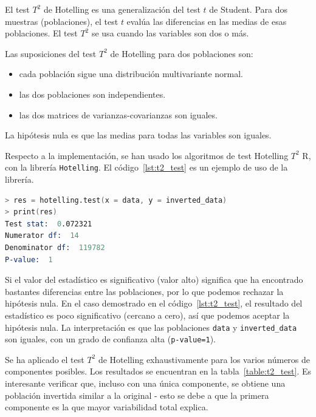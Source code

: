 \documentclass[11pt,spanish,listoffigures,listoftables]{tfgetsinf}
\begin{document}
    El test \(T^2\) de Hotelling es una generalización del test \(t\) de Student. Para dos muestras (poblaciones), el test \(t\) evalúa las diferencias en las medias de esas poblaciones. El test \(T^2\) se usa cuando las variables son dos o más.

    Las suposiciones del test \(T^2\) de Hotelling para dos poblaciones son:
    \begin{itemize}
    \item cada población sigue una distribución multivariante normal.
    \item las dos poblaciones son independientes.
    \item las dos matrices de varianzas-covarianzas son iguales.
    \end{itemize}
    
    La hipótesis nula es que las medias para todas las variables son iguales. 
    
    Respecto a la implementación, se han usado los algoritmos de test Hotelling \(T^2\) R, con la librería {\tt Hotelling}. El código~\ref{lst:t2_test} es un ejemplo de uso de la librería.

    \begin{lstlisting}[language=S, caption=Test \(T^2\) de Hotelling en R., label={lst:t2_test}]
> res = hotelling.test(x = data, y = inverted_data)
> print(res)
Test stat:  0.072321 
Numerator df:  14 
Denominator df:  119782 
P-value:  1
    \end{lstlisting}
    
    Si el valor del estadístico es significativo (valor alto) significa que ha encontrado bastantes diferencias entre las poblaciones, por lo que podemos rechazar la hipótesis nula. En el caso demostrado en el código~\ref{lst:t2_test}, el resultado del estadístico es poco significativo (cercano a cero), así que podemos aceptar la hipótesis nula. La interpretación es que las poblaciones {\tt data} y {\tt inverted\_data} son iguales, con un grado de confianza alta ({\tt p-value=1}).
    
    Se ha aplicado el test \(T^2\) de Hotelling exhaustivamente para los varios números de componentes posibles. Los resultados se encuentran en la tabla~\ref{table:t2_test}. Es interesante verificar que, incluso con una única componente, se obtiene una población invertida similar a la original - esto se debe a que la primera componente es la que mayor variabilidad total explica.
    
\end{document}
